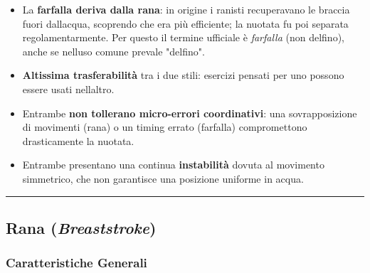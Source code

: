 \documentclass[a4paper,11pt]{article}
\providecommand{\tightlist}{%
  \setlength{\itemsep}{0pt}\setlength{\parskip}{0pt}}
\begin{document}
\begin{itemize}
      \tightlist
      \item
            La \textbf{farfalla deriva dalla rana}: in origine i ranisti
            recuperavano le braccia fuori dall\textquotesingle acqua, scoprendo
            che era più efficiente; la nuotata fu poi separata regolamentarmente.
            Per questo il termine ufficiale è \emph{farfalla} (non delfino), anche
            se nell\textquotesingle uso comune prevale "delfino".
      \item
            \textbf{Altissima trasferabilità} tra i due stili: esercizi pensati
            per uno possono essere usati nell\textquotesingle altro.
      \item
            Entrambe \textbf{non tollerano micro-errori coordinativi}: una
            sovrapposizione di movimenti (rana) o un timing errato (farfalla)
            compromettono drasticamente la nuotata.
      \item
            Entrambe presentano una continua \textbf{instabilità} dovuta al
            movimento simmetrico, che non garantisce una posizione uniforme in
            acqua.
\end{itemize}

\begin{center}\rule{0.5\linewidth}{0.5pt}\end{center}

\subsection{\texorpdfstring{Rana
            (\emph{Breaststroke})}{Rana (Breaststroke)}}\label{rana-breaststroke}

\subsubsection{Caratteristiche
      Generali}\label{caratteristiche-generali-2}
\end{document}
